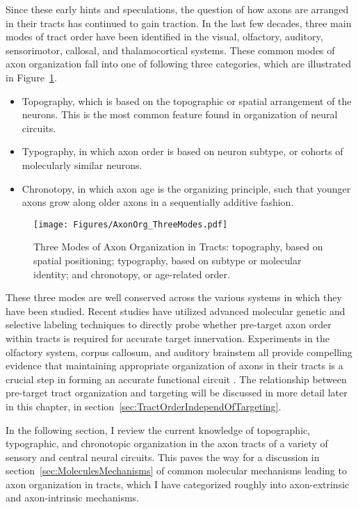 Since these early hints and speculations, the question of how axons are arranged in their tracts has continued to gain traction.
In the last few decades, three main modes of tract order have been identified in the visual, olfactory, auditory, sensorimotor, callosal, and thalamocortical systems.
These common modes of axon organization fall into one of following three categories, which are illustrated in Figure~\ref{AxonOrg_ThreeModes}.
\begin{itemize}
\item Topography, which is based on the topographic or spatial arrangement of the neurons. This is the most common feature found in organization of neural circuits.
\item Typography, in which axon order is based on neuron subtype, or cohorts of molecularly similar neurons.
\item Chronotopy, in which axon age is the organizing principle, such that younger axons grow along older axons in a sequentially additive fashion.
\end{itemize}
\begin{figure}[hbtp]
    \begin{center}
    \texttt{[image: Figures/AxonOrg\_ThreeModes.pdf]}
    \caption[Three Modes of Axon Organization in Tracts]{Three Modes of Axon Organization in Tracts: topography, based on spatial positioning; typography, based on subtype or molecular identity; and chronotopy, or age-related order. \label{AxonOrg_ThreeModes}}
    \end{center}
\end{figure}
These three modes are well conserved across the various systems in which they have been studied.
Recent studies have utilized advanced molecular genetic and selective labeling techniques to directly probe whether pre-target axon order within tracts is required for accurate target innervation.
Experiments in the olfactory system, corpus callosum, and auditory brainstem all provide compelling evidence that maintaining appropriate organization of axons in their tracts is a crucial step in forming an accurate functional circuit \cite{imai2009pre,zhou2013axon,michalski2013robo3}.
The relationship between pre-target tract organization and targeting will be discussed in more detail later in this chapter, in section~\ref{sec:TractOrderIndependOfTargeting}.

In the following section, I review the current knowledge of topographic, typographic, and chronotopic organization in the axon tracts of a variety of sensory and central neural circuits.
This paves the way for a discussion in section~\ref{sec:MoleculesMechanisms} of common molecular mechanisms leading to axon organization in tracts, which I have categorized roughly into axon-extrinsic and axon-intrinsic mechanisms.